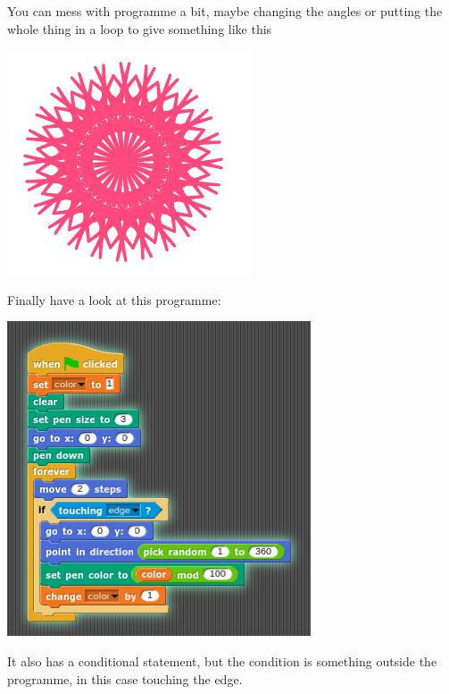 \documentclass[11pt,a4paper]{scrartcl}
\begin{document}
You can mess with programme a bit, maybe changing the angles or putting the whole thing in a loop to give something like this
\begin{center}
\includegraphics{rotating_star_pic.png}
\end{center}
Finally have a look at this programme:
\begin{center}
\includegraphics{center_rays.png}
\end{center}
It also has a conditional statement, but the condition is something outside the programme, in this case touching the edge.
\end{document}
